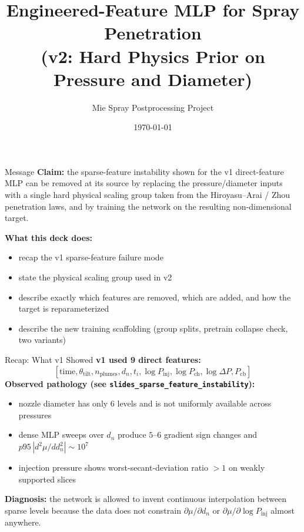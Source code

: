 \documentclass[UTF8,aspectratio=169]{ctexbeamer}
\title{Engineered-Feature MLP for Spray Penetration\\ (v2: Hard Physics Prior on Pressure and Diameter)}
\author{Mie Spray Postprocessing Project}
\date{\today}
\begin{document}
\begin{frame}
  \titlepage
\end{frame}

\begin{frame}{Message}
\textbf{Claim:} the sparse-feature instability shown for the v1 direct-feature MLP can be removed at its source by replacing the pressure/diameter inputs with a single hard physical scaling group taken from the Hiroyasu--Arai / Zhou penetration laws, and by training the network on the resulting non-dimensional target.

\vspace{0.4em}
\textbf{What this deck does:}
\begin{itemize}
  \item recap the v1 sparse-feature failure mode
  \item state the physical scaling group used in v2
  \item describe exactly which features are removed, which are added, and how the target is reparameterized
  \item describe the new training scaffolding (group splits, pretrain collapse check, two variants)
\end{itemize}
\end{frame}

\begin{frame}{Recap: What v1 Showed}
\textbf{v1 used 9 direct features:}
\[
[\text{time}, \theta_{\mathrm{tilt}}, n_{\mathrm{plumes}}, d_n, t_i, \log P_{\mathrm{inj}}, \log P_{\mathrm{ch}}, \log\Delta P, P_{\mathrm{cb}}]
\]
\textbf{Observed pathology (see \texttt{slides\_sparse\_feature\_instability}):}
\begin{itemize}
  \item nozzle diameter has only 6 levels and is not uniformly available across pressures
  \item dense MLP sweeps over $d_n$ produce $5$--$6$ gradient sign changes and $p95\,|d^2\mu/dd_n^2|\sim10^7$
  \item injection pressure shows worst-secant-deviation ratio $>1$ on weakly supported slices
\end{itemize}

\vspace{0.3em}
\textbf{Diagnosis:} the network is allowed to invent continuous interpolation between sparse levels because the data does not constrain $\partial\mu/\partial d_n$ or $\partial\mu/\partial\log P_{\mathrm{inj}}$ almost anywhere.
\end{frame}
\end{document}
